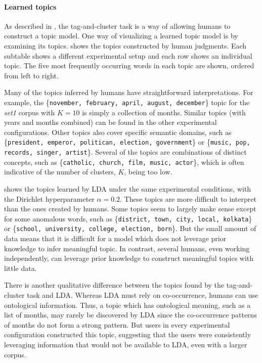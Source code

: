 \paragraph{Learned topics} As described in , the tag-and-cluster
task is a way of allowing humans to construct a topic model.  One way
of visualizing a learned topic model is by examining its topics.
 shows the topics constructed by human
judgments.  Each subtable shows a different experimental setup and
each row shows an individual topic.  The five most frequently
occurring words in each topic are shown, ordered from left to right.

Many of the topics inferred by humans have straightforward
interpretations.  For example, the \{\texttt{november, february,
  april, august, december}\} topic for the \emph{set1} corpus with
$K=10$ is simply a collection of months.  Similar topics (with years
and months combined) can be found in the other experimental
configurations.  Other topics also cover specific semantic domains,
such as \{\texttt{president, emperor, politican, election,
  government}\} or \{\texttt{music, pop, records, singer, artist}\}.
Several of the topics are combinations of distinct concepts, such as
\{\texttt{catholic, church, film, music, actor}\}, which is often
indicative of the number of clusters, $K$, being too low.

 shows the topics learned by LDA under
the same experimental conditions, with the Dirichlet hyperparameter
$\alpha = 0.2$.  These topics are more difficult to interpret than the
ones created by humans.  Some topics seem to largely make sense except
for some anomalous words, such as \{\texttt{district, town, city,
  local, kolkata}\} or \{\texttt{school, university, college,
  election, born}\}.  But the small amount of data means that it is
difficult for a model which does not leverage prior knowledge to infer
meaningful topic.  In contrast, several humans, even working
independently, can leverage prior knowledge to construct meaningful
topics with little data.

There is another qualitative difference between the topics found by
the tag-and-cluster task and LDA.  Whereas LDA must rely on
co-occurrence, humans can use ontological information.  Thus, a topic
which has ontological meaning, such as a list of months, may rarely be
discovered by LDA since the co-occurrence patterns of months do not
form a strong pattern.  But users in every experimental configuration
constructed this topic, suggesting that the users were consistently
leveraging information that would not be available to LDA, even with a
larger corpus.

